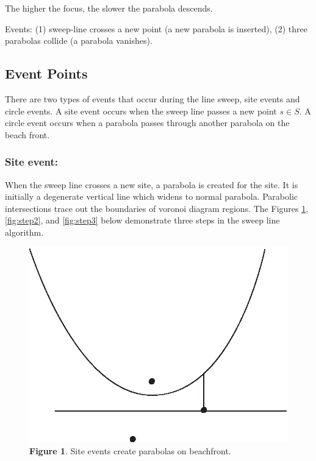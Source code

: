 \documentclass{article}
\begin{document}
The higher the focus, the slower the parabola descends.

Events: 	(1) sweep-line crosses a new point (a new parabola is inserted), (2) three parabolas collide (a parabola vanishes).


\subsection{Event Points}
There are two types of events that occur during the line sweep, site
events and circle events. A site event occurs when the sweep line passes a new point $s \in S$. A circle event occurs when a parabola passes through another parabola on the beach front.

\subsubsection{Site event:}
When the sweep line crosses a new site, a parabola is created for the site. It is initially a degenerate vertical line which widens to normal parabola. Parabolic intersections trace out the boundaries of voronoi diagram regions. The Figures  \ref{fig:step1}, \ref{fig:step2}, and  \ref{fig:step3}  below demonstrate three steps in the sweep line algorithm.


\begin{figure}[h]
\begin{center}
 \includegraphics{voronoistep1.jpg}
 \caption{\textbf{Figure 1}. Site events create parabolas on beachfront.}
 \label{fig:step1}
\end{center}
\end{figure}
\end{document}
